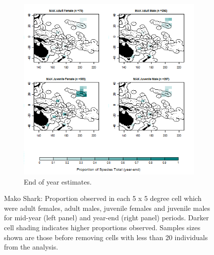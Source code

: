 \documentclass[12pt]{SCreport}
\begin{document}
\begin{landscape}
\begin{figure}
\begin{subfigure}[b]{0.6\textwidth}
       \includegraphics[width=\textwidth]{../GRAPHICS/Defined/BI_25_Map_maturity_sex_MAK}
       \caption{End of year estimates.}
       \label{fig:test2}
   \end{subfigure}
\caption{Mako Shark: Proportion observed in each 5 x 5 degree cell which were adult females, adult males, juvenile females and juvenile males for mid-year (left panel) and year-end (right panel) periods. Darker cell shading indicates higher proportions observed. Samples sizes shown are those before removing cells with less than 20 individuals from the analysis. }
\label{fig:test} 
\end{figure}
\end{landscape}
\end{document}
